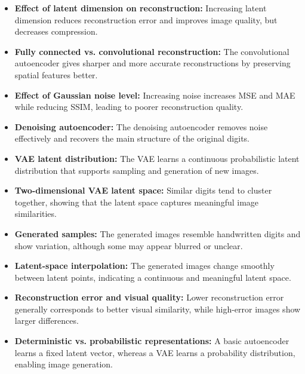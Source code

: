 \documentclass[10pt]{article}
\begin{document}
\begin{itemize}

\item \textbf{Effect of latent dimension on reconstruction:} Increasing latent dimension reduces reconstruction error and improves image quality, but decreases compression. 

\item \textbf{Fully connected vs. convolutional reconstruction:} The convolutional autoencoder gives sharper and more accurate reconstructions by preserving spatial features better. 

\item \textbf{Effect of Gaussian noise level:} Increasing noise increases MSE and MAE while reducing SSIM, leading to poorer reconstruction quality. 

\item \textbf{Denoising autoencoder:} The denoising autoencoder removes noise effectively and recovers the main structure of the original digits.

\item \textbf{VAE latent distribution:} The VAE learns a continuous probabilistic latent distribution that supports sampling and generation of new images. 
\item \textbf{Two-dimensional VAE latent space:} Similar digits tend to cluster together, showing that the latent space captures meaningful image similarities. 

\item \textbf{Generated samples:} The generated images resemble handwritten digits and show variation, although some may appear blurred or unclear. 
\item \textbf{Latent-space interpolation:} The generated images change smoothly between latent points, indicating a continuous and meaningful latent space. 

\item \textbf{Reconstruction error and visual quality:} Lower reconstruction error generally corresponds to better visual similarity, while high-error images show larger differences. 

\item \textbf{Deterministic vs. probabilistic representations:} A basic autoencoder learns a fixed latent vector, whereas a VAE learns a probability distribution, enabling image generation. 

\end{itemize}

\end{document}
